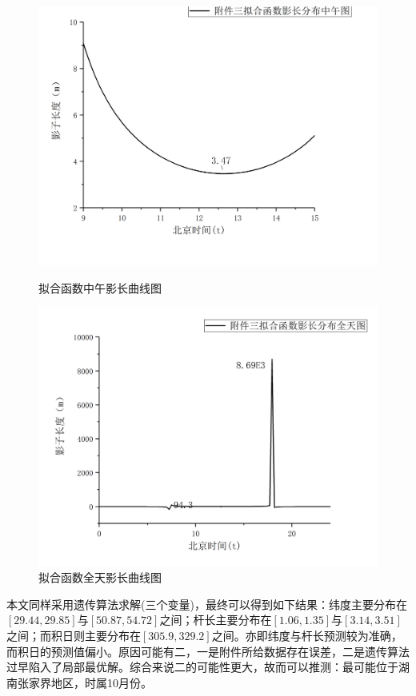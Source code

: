 \documentclass[12pt]{cumcmart}   %
\begin{document}
\begin{figure}[H]
	\centering
	\begin{minipage}{.45\textwidth}
		\centering
		\includegraphics[width=.95\textwidth]{images/yanzheng5.png}
		\caption{拟合函数中午影长曲线图}
		\label{yanzheng5}
	\end{minipage}\hfill
	\begin{minipage}{.45\textwidth}
		\centering
		\includegraphics[width=.95\textwidth]{images/yanzheng6.png}
		\caption{拟合函数全天影长曲线图}
		\label{yanzheng6}
	\end{minipage}	
\end{figure}

本文同样采用遗传算法求解(三个变量)，最终可以得到如下结果：纬度主要分布在$[29.44,29.85]$与$[50.87,54.72]$之间；杆长主要分布在$[1.06,1.35]$与$[3.14,3.51]$之间；而积日则主要分布在$[305.9,329.2]$之间。亦即纬度与杆长预测较为准确，而积日的预测值偏小。原因可能有二，一是附件所给数据存在误差，二是遗传算法过早陷入了局部最优解。综合来说二的可能性更大，故而可以推测：最可能位于湖南张家界地区，时属10月份。
\end{document}
